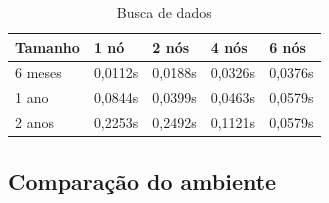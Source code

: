 \begin{table}[]
	\centering
	\caption{Busca de dados}
	\label{tab:select_busca}
	\begin{tabular}{lllll}
		\textbf{Tamanho} & \textbf{1 nó} & \textbf{2 nós} & \textbf{4 nós} & \textbf{6 nós} \\ \hline
		6 meses          & 0,0112s       & 0,0188s        & 0,0326s        & 0,0376s        \\ \hline
		1 ano            & 0,0844s       & 0,0399s        & 0,0463s        & 0,0579s        \\ \hline
		2 anos           & 0,2253s       & 0,2492s        & 0,1121s        & 0,0579s        \\ \hline
	\end{tabular}
\end{table}

\subsection{Comparação do ambiente}